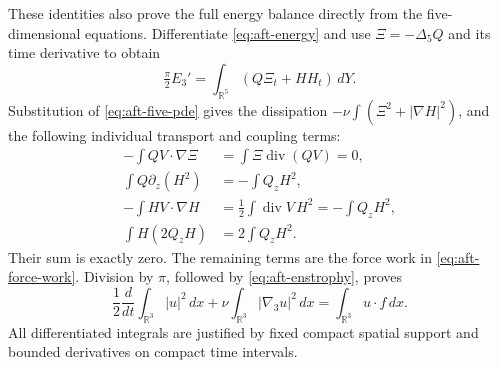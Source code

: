 These identities also prove the full energy balance directly from the
five-dimensional equations.  Differentiate \eqref{eq:aft-energy} and
use \(\Xi=-\Delta_5Q\) and its time derivative to obtain
\[
 \tfrac\pi2 E_3'
 =\int_{\mathbb R^5}(Q\Xi_t+HH_t)\,dY.
\]
Substitution of \eqref{eq:aft-five-pde} gives the dissipation
\(-\nu\int(\Xi^2+|\nabla H|^2)\), and the following individual
transport and coupling terms:
\begin{align*}
 -\int Q V\cdot\nabla\Xi&=\int\Xi\operatorname{div}(QV)=0,\\
 \int Q\partial_z(H^2)&=-\int Q_zH^2,\\
 -\int H V\cdot\nabla H&=\tfrac12\int\operatorname{div}V\,H^2
                         =-\int Q_zH^2,\\
 \int H(2Q_zH)&=2\int Q_zH^2.
\end{align*}
Their sum is exactly zero.  The remaining terms are the force work in
\eqref{eq:aft-force-work}.  Division by \(\pi\), followed by
\eqref{eq:aft-enstrophy}, proves
\begin{equation}\label{eq:aft-energy-balance}
 \frac12\frac{d}{dt}\int_{\mathbb R^3}|u|^2\,dx
 +\nu\int_{\mathbb R^3}|\nabla_3u|^2\,dx
 =\int_{\mathbb R^3}u\cdot f\,dx.
\end{equation}
All differentiated integrals are justified by fixed compact spatial
support and bounded derivatives on compact time intervals.

